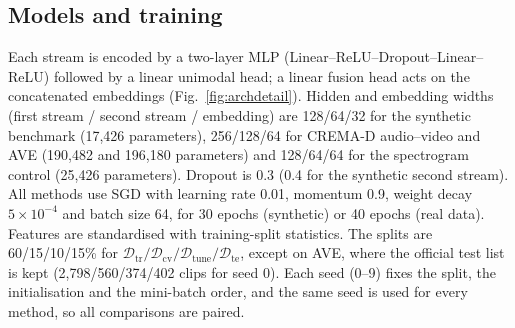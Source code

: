 \documentclass[fleqn,10pt]{wlscirep}
\begin{document}
\subsection*{Models and training}
Each stream is encoded by a two-layer MLP (Linear--ReLU--Dropout--Linear--ReLU) followed by a linear unimodal head; a linear fusion head acts on the concatenated embeddings (Fig.~\ref{fig:archdetail}). Hidden and embedding widths (first stream / second stream / embedding) are 128/64/32 for the synthetic benchmark (17,426 parameters), 256/128/64 for CREMA-D audio--video and AVE (190,482 and 196,180 parameters) and 128/64/64 for the spectrogram control (25,426 parameters). Dropout is 0.3 (0.4 for the synthetic second stream). All methods use SGD with learning rate 0.01, momentum 0.9, weight decay $5{\times}10^{-4}$ and batch size 64, for 30 epochs (synthetic) or 40 epochs (real data). Features are standardised with training-split statistics. The splits are 60/15/10/15\% for $\mathcal{D}_{\mathrm{tr}}/\mathcal{D}_{\mathrm{cv}}/\mathcal{D}_{\mathrm{tune}}/\mathcal{D}_{\mathrm{te}}$, except on AVE, where the official test list is kept (2,798/560/374/402 clips for seed 0). Each seed (0--9) fixes the split, the initialisation and the mini-batch order, and the same seed is used for every method, so all comparisons are paired.
\end{document}
